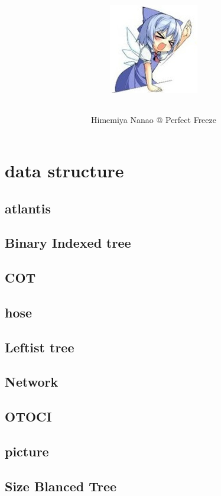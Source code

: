 \documentclass[a4paper,5pt,twocolumn,titlepage]{article}
\title{\TitleFont{Code Library}
\begin{center}
\includegraphics[scale=2]{./image1.png}
\end{center}
}
\author{Himemiya Nanao @ Perfect Freeze}
\begin{document}
\maketitle \tableofcontents
\newpage
{}


\section{data structure}
\subsection{atlantis}

\subsection{Binary Indexed tree}

\subsection{COT}

\subsection{hose}

\subsection{Leftist tree}

\subsection{Network}

\subsection{OTOCI}

\subsection{picture}

\subsection{Size Blanced Tree}

\end{document}
